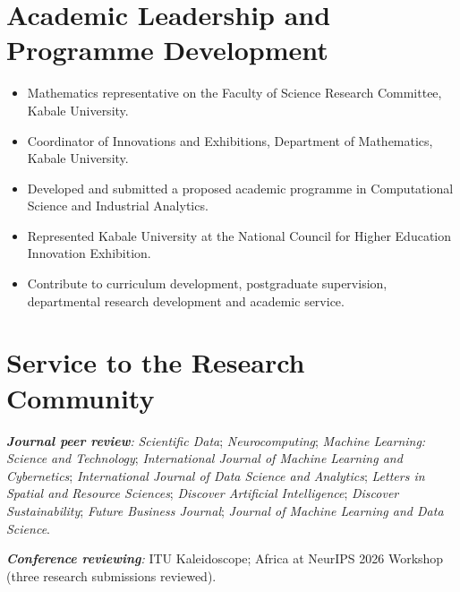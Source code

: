 \documentclass[11pt,a4paper]{article}
\begin{document}
\section{Academic Leadership and Programme Development}

\begin{itemize}

\item
Mathematics representative on the Faculty of Science Research Committee,
Kabale University.

\item
Coordinator of Innovations and Exhibitions, Department of Mathematics, Kabale University.

\item
Developed and submitted a proposed academic programme in Computational Science and Industrial Analytics.

\item
Represented Kabale University at the National Council for Higher Education Innovation Exhibition.

\item
Contribute to curriculum development, postgraduate supervision,
departmental research development and academic service.

\end{itemize}

\section{Service to the Research Community}

\textit{\textbf{Journal peer review}:}
\textit{Scientific Data};
\textit{Neurocomputing};
\textit{Machine Learning: Science and Technology};
\textit{International Journal of Machine Learning and Cybernetics};
\textit{International Journal of Data Science and Analytics};
\textit{Letters in Spatial and Resource Sciences};
\textit{Discover Artificial Intelligence};
\textit{Discover Sustainability};
\textit{Future Business Journal};
\textit{Journal of Machine Learning and Data Science}.

\vspace{3pt}

\textit{\textbf{Conference reviewing}:}
ITU Kaleidoscope;
Africa at NeurIPS 2026 Workshop
(three research submissions reviewed).

%
\end{document}
